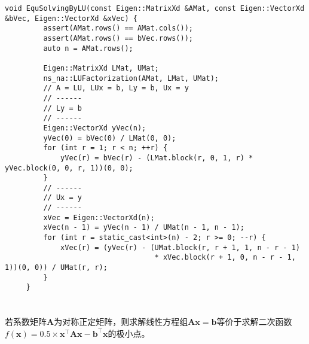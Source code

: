 \documentclass[12pt, onecolumn]{article}
\newcommand\normf{\fangsong}
\begin{document}
	\begin{lstlisting}[caption=杜利特尔(Doolittle)分解求解线性方程组]
	 void EquSolvingByLU(const Eigen::MatrixXd &AMat, const Eigen::VectorXd &bVec, Eigen::VectorXd &xVec) {
	     assert(AMat.rows() == AMat.cols());
	     assert(AMat.rows() == bVec.rows());
	     auto n = AMat.rows();
	
	     Eigen::MatrixXd LMat, UMat;
	     ns_na::LUFactorization(AMat, LMat, UMat);
	     // A = LU, LUx = b, Ly = b, Ux = y
	     // ------
	     // Ly = b
	     // ------
	     Eigen::VectorXd yVec(n);
	     yVec(0) = bVec(0) / LMat(0, 0);
	     for (int r = 1; r < n; ++r) {
	         yVec(r) = bVec(r) - (LMat.block(r, 0, 1, r) * yVec.block(0, 0, r, 1))(0, 0);
	     }
	     // ------
	     // Ux = y
	     // ------
	     xVec = Eigen::VectorXd(n);
	     xVec(n - 1) = yVec(n - 1) / UMat(n - 1, n - 1);
	     for (int r = static_cast<int>(n) - 2; r >= 0; --r) {
	         xVec(r) = (yVec(r) - (UMat.block(r, r + 1, 1, n - r - 1)
	                               * xVec.block(r + 1, 0, n - r - 1, 1))(0, 0)) / UMat(r, r);
	     }
	 }
	\end{lstlisting}
	
	\newpage
	\section{\normf{梯度下降}}
	\subsection{\normf{算法描述}}
	若系数矩阵$\boldsymbol{A}$为对称正定矩阵，则求解线性方程组$\boldsymbol{Ax}=\boldsymbol{b}$等价于求解二次函数$f(\boldsymbol{x})=0.5\times \boldsymbol{x}^\top\boldsymbol{A}\boldsymbol{x}-\boldsymbol{b}^\top\boldsymbol{x}$的极小点。
	
\end{document}
